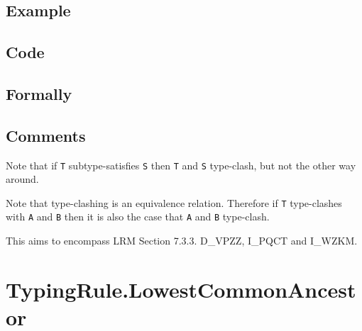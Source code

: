 \documentclass{book}
\begin{document}
  \subsection{Example}

  \subsection{Code}

\begin{emptyformal}
    \subsection{Formally}
\end{emptyformal}

\subsection{Comments}
  Note that if \texttt{T} subtype-satisfies \texttt{S} then \texttt{T} and \texttt{S} type-clash, but not the other
  way around.

  Note that type-clashing is an equivalence relation. Therefore if \texttt{T}
  type-clashes with \texttt{A} and \texttt{B} then it is also the case that \texttt{A} and \texttt{B} type-clash.

  This aims to encompass LRM Section 7.3.3. D\_VPZZ, I\_PQCT and I\_WZKM.

\section{TypingRule.LowestCommonAncestor \label{sec:TypingRule.LowestCommonAncestor}}
\end{document}
